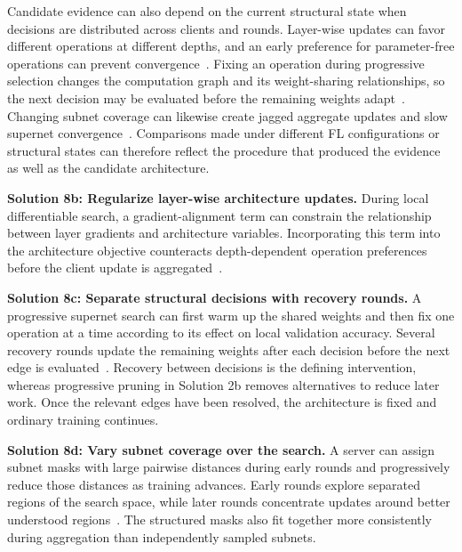 Candidate evidence can also depend on the current structural state when decisions are distributed across clients and rounds. Layer-wise updates can favor different operations at different depths, and an early preference for parameter-free operations can prevent convergence~\cite{remote_sensing_fednas_2025}. Fixing an operation during progressive selection changes the computation graph and its weight-sharing relationships, so the next decision may be evaluated before the remaining weights adapt~\cite{spider_2021}. Changing subnet coverage can likewise create jagged aggregate updates and slow supernet convergence~\cite{divide-and-conquer_fednas_2023}. Comparisons made under different FL configurations or structural states can therefore reflect the procedure that produced the evidence as well as the candidate architecture.

\noindent\textbf{Solution 8b: Regularize layer-wise architecture updates.} During local differentiable search, a gradient-alignment term can constrain the relationship between layer gradients and architecture variables. Incorporating this term into the architecture objective counteracts depth-dependent operation preferences before the client update is aggregated~\cite{remote_sensing_fednas_2025}.

\noindent\textbf{Solution 8c: Separate structural decisions with recovery rounds.} A progressive supernet search can first warm up the shared weights and then fix one operation at a time according to its effect on local validation accuracy. Several recovery rounds update the remaining weights after each decision before the next edge is evaluated~\cite{spider_2021}. Recovery between decisions is the defining intervention, whereas progressive pruning in Solution 2b removes alternatives to reduce later work. Once the relevant edges have been resolved, the architecture is fixed and ordinary training continues.

\noindent\textbf{Solution 8d: Vary subnet coverage over the search.} A server can assign subnet masks with large pairwise distances during early rounds and progressively reduce those distances as training advances. Early rounds explore separated regions of the search space, while later rounds concentrate updates around better understood regions~\cite{divide-and-conquer_fednas_2023}. The structured masks also fit together more consistently during aggregation than independently sampled subnets.
